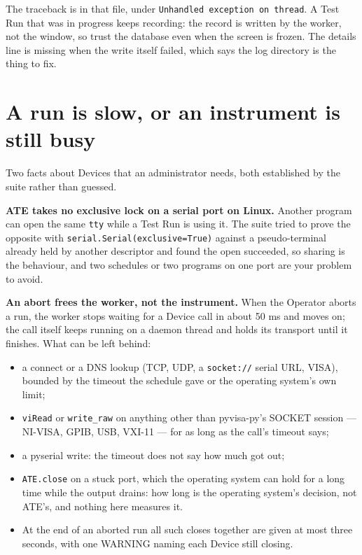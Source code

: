 The traceback is in that file, under \texttt{Unhandled exception on thread}. A Test Run that was in
progress keeps recording: the record is written by the worker, not the window, so trust the database
even when the screen is frozen. The details line is missing when the write itself failed, which says
the log directory is the thing to fix.

\section{A run is slow, or an instrument is still busy}

Two facts about Devices that an administrator needs, both established by the suite rather than
guessed.

\textbf{ATE takes no exclusive lock on a serial port on Linux.} Another program can open the same
\texttt{tty} while a Test Run is using it. The suite tried to prove the opposite with
\texttt{serial.Serial(exclusive=True)} against a pseudo-terminal already held by another descriptor
and found the open succeeded, so sharing is the behaviour, and two schedules or two programs on one
port are your problem to avoid.

\textbf{An abort frees the worker, not the instrument.} When the Operator aborts a run, the worker
stops waiting for a Device call in about 50 ms and moves on; the call itself keeps running on a
daemon thread and holds its transport until it finishes. What can be left behind:

\begin{itemize}
  \item a connect or a DNS lookup (TCP, UDP, a \texttt{socket://} serial URL, VISA), bounded by the
    timeout the schedule gave or the operating system's own limit;
  \item \texttt{viRead} or \texttt{write\_raw} on anything other than pyvisa-py's SOCKET session ---
    NI-VISA, GPIB, USB, VXI-11 --- for as long as the call's timeout says;
  \item a pyserial write: the timeout does not say how much got out;
  \item \texttt{ATE.close} on a stuck port, which the operating system can hold for a long time
    while the output drains: how long is the operating system's decision, not ATE's, and nothing
    here measures it.
  \item At the end of an aborted run all such closes together are given at most three seconds, with
    one WARNING naming each Device still closing.
\end{itemize}

